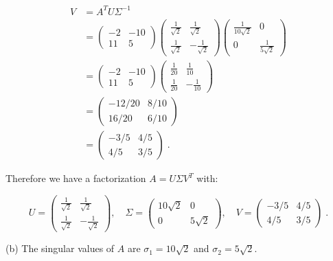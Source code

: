 \documentclass[11pt]{article}
\begin{document}
\begin{align*}
V &= A^TU\Sigma^{-1} \\
&= \begin{pmatrix}
-2 & -10 \\ 11 & 5
\end{pmatrix} \begin{pmatrix}
\frac{1}{\sqrt{2}} & \frac{1}{\sqrt{2}} \\ \frac{1}{\sqrt{2}} & -\frac{1}{\sqrt{2}}
\end{pmatrix} \begin{pmatrix}
\frac{1}{10\sqrt{2}} & 0 \\ 0 & \frac{1}{5\sqrt{2}}
\end{pmatrix}\\
&= \begin{pmatrix}
-2 & -10 \\ 11 & 5
\end{pmatrix} \begin{pmatrix}
\frac{1}{20} & \frac{1}{10} \\ \frac{1}{20} & -\frac{1}{10}
\end{pmatrix} \\
&= \begin{pmatrix}
-12/20 & 8/10 \\ 16/20 & 6/10
\end{pmatrix}\\
&= \begin{pmatrix}
-3/5 & 4/5 \\ 4/5 & 3/5
\end{pmatrix} \;.
\end{align*} 

Therefore we have a factorization $A = U\Sigma V^T$ with:

$$U = \begin{pmatrix}
\frac{1}{\sqrt{2}} & \frac{1}{\sqrt{2}} \\ \frac{1}{\sqrt{2}} & -\frac{1}{\sqrt{2}}
\end{pmatrix}, \quad \Sigma = \begin{pmatrix}
10\sqrt{2} & 0 \\ 0 & 5\sqrt{2}
\end{pmatrix}, \quad V = \begin{pmatrix}
-3/5 & 4/5 \\ 4/5 & 3/5
\end{pmatrix} \;.$$

(b) The singular values of $A$ are $\sigma_1 = 10\sqrt{2}$ and $\sigma_2 = 5\sqrt{2}$.\\
\end{document}
